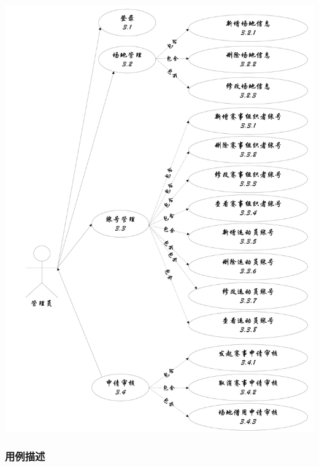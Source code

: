 \documentclass[a4paper,UTF8]{article}
\begin{document}
{	\centering\includegraphics[width=1\columnwidth]{uc3}
	
}

\subsubsection{用例描述}
\end{document}
